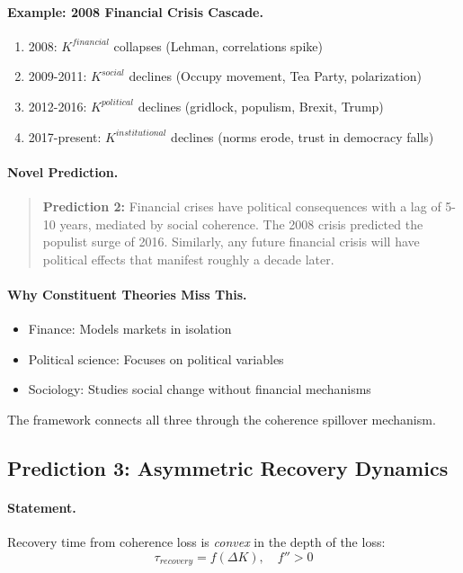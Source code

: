 \paragraph{Example: 2008 Financial Crisis Cascade.}
\begin{enumerate}
  \item 2008: $K^{financial}$ collapses (Lehman, correlations spike)
  \item 2009-2011: $K^{social}$ declines (Occupy movement, Tea Party, polarization)
  \item 2012-2016: $K^{political}$ declines (gridlock, populism, Brexit, Trump)
  \item 2017-present: $K^{institutional}$ declines (norms erode, trust in democracy falls)
\end{enumerate}

\paragraph{Novel Prediction.}
\begin{quote}
\textbf{Prediction 2:} Financial crises have political consequences
with a lag of 5-10 years, mediated by social coherence.
The 2008 crisis predicted the populist surge of 2016.
Similarly, any future financial crisis will have political effects
that manifest roughly a decade later.
\end{quote}

\paragraph{Why Constituent Theories Miss This.}
\begin{itemize}
  \item Finance: Models markets in isolation
  \item Political science: Focuses on political variables
  \item Sociology: Studies social change without financial mechanisms
\end{itemize}

The framework connects all three through the coherence spillover mechanism.

\subsection{Prediction 3: Asymmetric Recovery Dynamics}

\paragraph{Statement.}
Recovery time from coherence loss is \emph{convex} in the depth of the loss:
\begin{equation}
  \tau_{recovery} = f(\Delta K), \quad f'' > 0
\end{equation}

